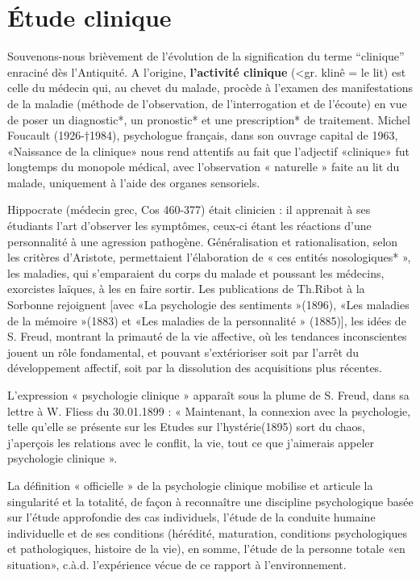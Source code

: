 \chapter[\'Etude clinique]{\'Etude clinique}

Souvenons-nous brièvement de l'évolution de la signification du terme
``clinique'' enraciné dès l'Antiquité.
A l’origine,\textbf{ l’activité clinique} (<gr. klinê = le lit) est celle du médecin qui, au chevet du malade, procède à l’examen des manifestations de la maladie (méthode de l’observation, de l’interrogation et de l’écoute) en vue de poser un diagnostic*, un pronostic* et une prescription* de traitement.
Michel Foucault (1926-†1984), psychologue français, dans son ouvrage capital de 1963,
«Naissance de la clinique» nous rend attentifs au fait que l’adjectif «clinique» fut longtemps du monopole médical, avec l’observation « naturelle » faite au lit du malade, uniquement à l’aide des organes sensoriels.

Hippocrate (médecin grec, Cos 460-377) était clinicien : il apprenait à ses étudiants l’art d’observer les symptômes, ceux-ci étant les réactions d’une personnalité à une agression pathogène. Généralisation et rationalisation, selon les critères d’Aristote, permettaient l’élaboration de « ces entités nosologiques* », les maladies, qui s’emparaient du corps du malade et poussant les médecins, exorcistes laïques, à les en faire sortir.
Les publications de Th.Ribot à la Sorbonne rejoignent [avec «La psychologie des sentiments »(1896), «Les maladies de la mémoire »(1883) et «Les maladies de la personnalité » (1885)], les idées de S. Freud, montrant la primauté de la vie affective, où les tendances inconscientes jouent un rôle fondamental, et pouvant s’extérioriser soit par l’arrêt du développement affectif, soit par la dissolution des acquisitions plus récentes.

L’expression « psychologie clinique » apparaît sous la plume de S. Freud, dans sa lettre à W. Fliess du 30.01.1899 : « Maintenant, la connexion avec la psychologie, telle qu’elle se présente sur les Etudes sur l’hystérie(1895) sort du chaos, j’aperçois les relations avec le conflit, la vie, tout ce que j’aimerais appeler psychologie clinique ». 

La définition « officielle » de la psychologie clinique mobilise et articule la singularité et
la totalité, de façon à reconnaître une discipline psychologique basée sur l’étude approfondie des cas individuels, l’étude de la conduite humaine individuelle et de ses conditions (hérédité, maturation, conditions psychologiques et pathologiques, histoire de la vie), en somme, l’étude de la personne totale «en situation», c.à.d. l’expérience vécue de ce rapport à l’environnement.


